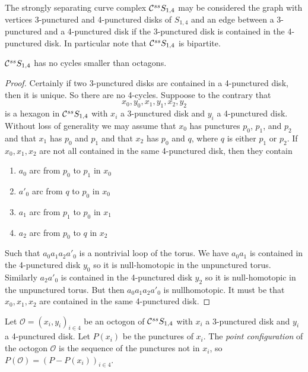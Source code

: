 The strongly separating curve complex
$ \mathcal C^{{ss}}  S_{1,4}$
may be considered the graph with vertices 3-punctured and 4-punctured disks of $S_{1,4}$
and an edge between a 3-punctured and a 4-punctured disk if the 3-punctured disk
is contained in the 4-punctured disk.
In particular note that $ \mathcal C^{{ss}}  S_{1,4}$ is bipartite.


\begin{lemma}
  $ \mathcal C^{{ss}}  S_{1,4}$ has no cycles smaller than octagons.
\end{lemma}

\begin{proof}
  Certainly if two 3-punctured disks are contained in a 4-punctured disk, then it is unique.
  So there are no 4-cycles.
  Suppoose to the contrary that
  $$x_0, y_0, x_1, y_1, x_2, y_2$$
  is a hexagon in $ \mathcal C^{{ss}}  S_{1,4}$ with $x_i$ a 3-punctured disk and $y_i$ a 4-punctured disk.
  Without loss of generality we may assume that
  $x_0$ has punctures $p_0$, $p_1$, and $p_2$ and that $x_1$ has $p_0$ and $p_1$
  and that $x_2$ has $p_0$ and $q$, where $q$ is either $p_1$ or $p_2$.
  If $x_0,x_1,x_2$ are not all contained in the same 4-punctured disk,
  then they contain
  \begin{enumerate}[$\cdot$]
  \item
    $a_0$ arc from $p_0$ to $p_1$ in $x_0$
  \item
   $a'_0$ arc from $q$ to $p_0$ in $x_0$
  \item
   $a_1$ arc from $p_1$ to $p_0$ in $x_1$
   \item
    $a_2$ arc from $p_0$ to $q$ in $x_2$
  \end{enumerate}
  Such that $a_0a_1a_2a'_0$ is a nontrivial loop of the torus.
  We have $a_0a_1$ is contained in the 4-punctured disk $y_0$ so it is null-homotopic in the unpunctured torus.
  Similarly $a_2a'_0$ is contained in the 4-punctured disk $y_2$ so it is null-homotopic in the unpunctured torus.
  But then $a_0a_1a_2a'_0$ is nullhomotopic.
  It must be that $x_0,x_1,x_2$ are contained in the same 4-punctured disk.
\end{proof}


\begin{definition}
  Let $\mathcal O=(x_i,y_i)_{i \in 4}$ be an octogon of $ \mathcal C^{{ss}}  S_{1,4}$
  with $x_i$ a 3-punctured disk and $y_i$ a 4-punctured disk.
  Let $P(x_i)$ be the punctures of $x_i$.
  The \emph{point configuration} of the octogon $\mathcal O$ is the sequence
  of the punctures not in $x_i$, so
   $P(\mathcal O)= (P-P(x_i))_{i \in 4}$.
\end{definition}

